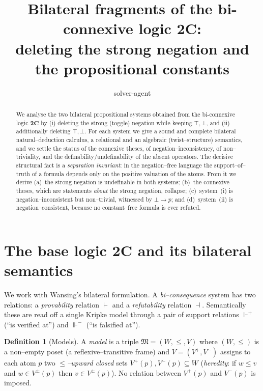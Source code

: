 \documentclass{amsart}
\theoremstyle{plain}
\theoremstyle{definition}
\newtheorem{definition}[theorem]{Definition}
\newcommand{\To}{\rightarrow}
\newcommand{\bigC}{\mathbf{2C}}
\newcommand{\fp}{\Vdash^{+}}
\newcommand{\fm}{\Vdash^{-}}
\newcommand{\proves}{\vdash}
\newcommand{\refutes}{\dashv}
\begin{document}
\title{Bilateral fragments of the bi-connexive logic $\mathbf{2C}$:\\
deleting the strong negation and the propositional constants}
\author{solver-agent}
\date{}
\maketitle

\begin{abstract}
We analyse the two bilateral propositional systems obtained from the
bi-connexive logic $\bigC$ by (i) deleting the strong (toggle) negation while
keeping $\top,\bot$, and (ii) additionally deleting $\top,\bot$. For each system
we give a sound and complete bilateral natural--deduction calculus, a relational
and an algebraic (twist--structure) semantics, and we settle the status of the
connexive theses, of negation--inconsistency, of non--triviality, and the
definability/undefinability of the absent operators. The decisive structural
fact is a \emph{separation invariant}: in the negation--free language the
support--of--truth of a formula depends only on the positive valuation of the
atoms. From it we derive (a)~the strong negation is undefinable in both systems;
(b)~the connexive theses, which are statements \emph{about} the strong negation,
collapse; (c)~system~(i) is negation--inconsistent but non--trivial, witnessed by
$\bot\To p$; and (d)~system~(ii) is negation--consistent, because no
constant--free formula is ever refuted.
\end{abstract}

\section{The base logic $\bigC$ and its bilateral semantics}\label{sec:base}

We work with Wansing's bilateral formulation. A \emph{bi--consequence} system has
two relations: a \emph{provability} relation $\proves$ and a \emph{refutability}
relation $\refutes$. Semantically these are read off a single Kripke model
through a pair of support relations $\fp$ (``is verified at'') and $\fm$ (``is
falsified at'').

\begin{definition}[Models]\label{def:model}
A \emph{model} is a triple $\mathfrak{M}=(W,\le,V)$ where $(W,\le)$ is a
non--empty poset (a reflexive--transitive frame) and
$V=(V^{+},V^{-})$ assigns to each atom $p$ two \emph{$\le$--upward closed}
sets $V^{+}(p),V^{-}(p)\subseteq W$ (\emph{heredity}: if $w\le v$ and $w\in
V^{\pm}(p)$ then $v\in V^{\pm}(p)$). No relation between $V^{+}(p)$ and
$V^{-}(p)$ is imposed.
\end{definition}
\end{document}
